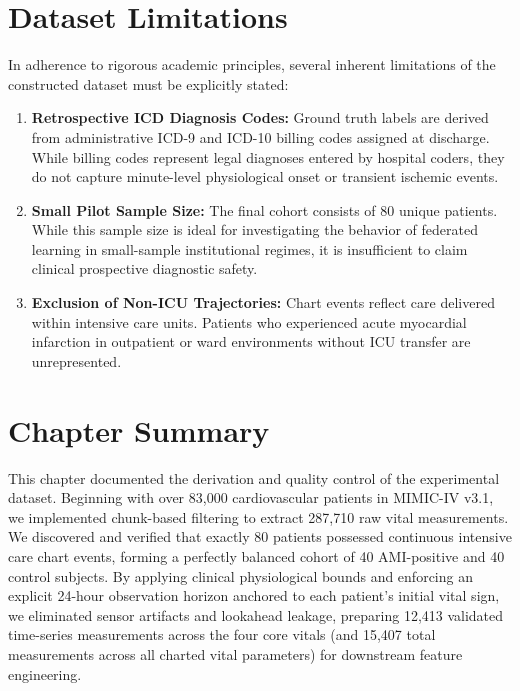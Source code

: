 \section{Dataset Limitations}
\label{sec:dataset_limitations}

In adherence to rigorous academic principles, several inherent limitations of the constructed dataset must be explicitly stated:
\begin{enumerate}
    \item \textbf{Retrospective ICD Diagnosis Codes:} Ground truth labels are derived from administrative ICD-9 and ICD-10 billing codes assigned at discharge. While billing codes represent legal diagnoses entered by hospital coders, they do not capture minute-level physiological onset or transient ischemic events.
    \item \textbf{Small Pilot Sample Size:} The final cohort consists of 80 unique patients. While this sample size is ideal for investigating the behavior of federated learning in small-sample institutional regimes, it is insufficient to claim clinical prospective diagnostic safety.
    \item \textbf{Exclusion of Non-ICU Trajectories:} Chart events reflect care delivered within intensive care units. Patients who experienced acute myocardial infarction in outpatient or ward environments without ICU transfer are unrepresented.
\end{enumerate}

\section{Chapter Summary}
\label{sec:chapter3_summary}

This chapter documented the derivation and quality control of the experimental dataset. Beginning with over 83,000 cardiovascular patients in MIMIC-IV v3.1, we implemented chunk-based filtering to extract 287,710 raw vital measurements. We discovered and verified that exactly 80 patients possessed continuous intensive care chart events, forming a perfectly balanced cohort of 40 AMI-positive and 40 control subjects. By applying clinical physiological bounds and enforcing an explicit 24-hour observation horizon anchored to each patient's initial vital sign, we eliminated sensor artifacts and lookahead leakage, preparing 12,413 validated time-series measurements across the four core vitals (and 15,407 total measurements across all charted vital parameters) for downstream feature engineering.
